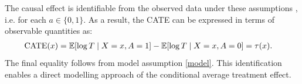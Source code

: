 The causal effect is identifiable from the observed data under these assumptions \citep{Imbens2004Identification}, i.e.  \protect{$\E[\log T(a) \mid X = x] = \E[\log T \mid X = x, A = a]$} for each $a \in \{0,1\}$.
As a result, the CATE can be expressed in terms of observable quantities as:
\begin{equation}
\begin{split}
    \text{CATE}(x) &= \mathbb{E}[\log T \mid X = x, A = 1] - \mathbb{E}[\log T \mid X = x, A = 0] =\tau(x).
\end{split}
\end{equation}
The final equality follows from model assumption \eqref{model}. 
This identification enables a direct modelling approach of the conditional average treatment effect.